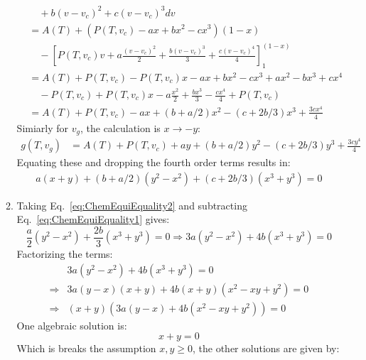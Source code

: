 \documentclass[12pt,a4]{article}
\begin{document}
\begin{enumerate}
\begin{enumerate}
\begin{align*}
                    & \quad + b(v - v_c)^2  + c (v - v_c)^3 dv\\
                    &= A(T) + \left(P(T, v_c) - a x + b x^2 - c x^3\right)(1 - x) \\
                    & \quad - \left[ P(T, v_c)v + a \frac{(v - v_c)^2}{2} + \frac{b(v - v_c)^3}{3}  + \frac{c (v - v_c)^4}{4}\right]_1^{(1-x)}\\
                    &= A(T) + P(T, v_c) - P(T, v_c) x - a x + b x^2 - c x^3 + a x^2 - b x^3 + c x^4 \\
                    & \quad - P(T, v_c) + P(T, v_c) x - a \frac{x^2}{2} + \frac{bx^3}{3} - \frac{c x^4}{4} + P(T, v_c)\\
                    &= A(T) + P(T, v_c) - a x + (b + a / 2) x^2 - (c + 2 b / 3) x^3 + \frac{3 c x^4}{4}
        \end{align*}
        Simiarly for $v_g$, the calculation is $x \to -y$:
        \begin{align*}
          g(T, v_g) &= A(T) + P(T, v_c) + a y + (b + a / 2) y^2 - (c + 2 b / 3) y^3 + \frac{3 c y^4}{4}
        \end{align*}
        Equating these and dropping the fourth order terms results in:
        \begin{align}
          a (x + y)  + (b + a / 2) ( y^2 - x^2)  + (c + 2 b / 3) (x^3 + y ^3) = 0 \label{eq:ChemEquiEquality2}
        \end{align}
      \item
        Taking Eq.~\ref{eq:ChemEquiEquality2} and subtracting Eq.~\ref{eq:ChemEquiEquality1} gives:
        \begin{equation*}
          \frac{a}{2}(y^2 - x^2) + \frac{2 b}{3} (x^3 + y^3) = 0 \Rightarrow 3 a(y^2 - x^2) + 4 b (x^3 + y^3) = 0
        \end{equation*}
        Factorizing the terms:
        \begin{align*}
                      &3 a(y^2 - x^2) + 4 b (x^3 + y^3) = 0\\
          \Rightarrow &3 a(y - x)(x + y) + 4 b (x + y) (x^2  - xy + y^2) = 0\\
          \Rightarrow &(x + y)(3 a (y - x) + 4 b (x^2  - xy + y^2)) = 0
        \end{align*}
        One algebraic solution is:
        \begin{equation*}
          x + y = 0
        \end{equation*}
        Which is breaks the assumption $x, y \geq 0$, the other solutions are given by:
        \begin{equation*}

\end{equation*}
\end{enumerate}
\end{enumerate}
\end{document}
